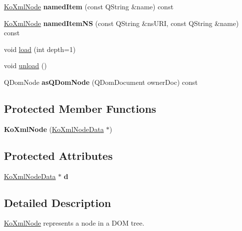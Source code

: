 \begin{DoxyCompactItemize}
\item 
\hypertarget{classKoXmlNode_a3c1e84615051a447ad66de67b4cb3b51}{
\hyperlink{classKoXmlNode}{KoXmlNode} {\bfseries namedItem} (const QString \&name) const }
\label{classKoXmlNode_a3c1e84615051a447ad66de67b4cb3b51}

\item 
\hypertarget{classKoXmlNode_a875cc1bd632bdce741ef0e64c2e8e348}{
\hyperlink{classKoXmlNode}{KoXmlNode} {\bfseries namedItemNS} (const QString \&nsURI, const QString \&name) const }
\label{classKoXmlNode_a875cc1bd632bdce741ef0e64c2e8e348}

\item 
void \hyperlink{classKoXmlNode_a00f067df3c054abdb722f3cdf372f58f}{load} (int depth=1)
\item 
void \hyperlink{classKoXmlNode_a6db615544f532dec26530d2fe413c946}{unload} ()
\item 
\hypertarget{classKoXmlNode_acc8aa6574d8389e8ba9e1bc758d1038d}{
QDomNode {\bfseries asQDomNode} (QDomDocument ownerDoc) const }
\label{classKoXmlNode_acc8aa6574d8389e8ba9e1bc758d1038d}

\end{DoxyCompactItemize}
\subsection*{Protected Member Functions}
\begin{DoxyCompactItemize}
\item 
\hypertarget{classKoXmlNode_a150c3bcb9ccb9978784733a72fc56230}{
{\bfseries KoXmlNode} (\hyperlink{classKoXmlNodeData}{KoXmlNodeData} $\ast$)}
\label{classKoXmlNode_a150c3bcb9ccb9978784733a72fc56230}

\end{DoxyCompactItemize}
\subsection*{Protected Attributes}
\begin{DoxyCompactItemize}
\item 
\hypertarget{classKoXmlNode_a09a35b2e854d2bca37c7c43aa89fa4e5}{
\hyperlink{classKoXmlNodeData}{KoXmlNodeData} $\ast$ {\bfseries d}}
\label{classKoXmlNode_a09a35b2e854d2bca37c7c43aa89fa4e5}

\end{DoxyCompactItemize}


\subsection{Detailed Description}
\hyperlink{classKoXmlNode}{KoXmlNode} represents a node in a DOM tree.

